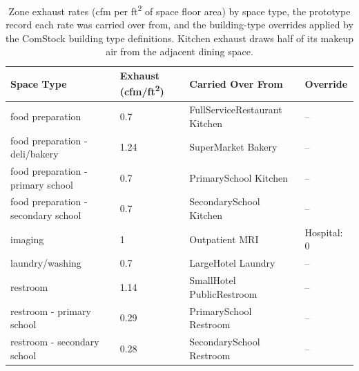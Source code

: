 \begin{table}[h!]
\scriptsize
\centering
\caption[Zone Exhaust Rates by Space Type]{Zone exhaust rates (cfm per ft\textsuperscript{2} of space floor area) by space type, the prototype record each rate was carried over from, and the building-type overrides applied by the ComStock building type definitions. Kitchen exhaust draws half of its makeup air from the adjacent dining space.}
\label{tab:exhaust_rates}
\begin{tabular}{|p{2.2in}|p{0.8in}|p{1.6in}|p{1.4in}|}
\hline
\textbf{Space Type} & \textbf{Exhaust (cfm/ft\textsuperscript{2})} & \textbf{Carried Over From} & \textbf{Override} \\ \hline
food preparation & 0.7 & FullServiceRestaurant Kitchen & -- \\ \hline
food preparation - deli/bakery & 1.24 & SuperMarket Bakery & -- \\ \hline
food preparation - primary school & 0.7 & PrimarySchool Kitchen & -- \\ \hline
food preparation - secondary school & 0.7 & SecondarySchool Kitchen & -- \\ \hline
imaging & 1 & Outpatient MRI & Hospital: 0 \\ \hline
laundry/washing & 0.7 & LargeHotel Laundry & -- \\ \hline
restroom & 1.14 & SmallHotel PublicRestroom & -- \\ \hline
restroom - primary school & 0.29 & PrimarySchool Restroom & -- \\ \hline
restroom - secondary school & 0.28 & SecondarySchool Restroom & -- \\ \hline
\end{tabular}
\end{table}
